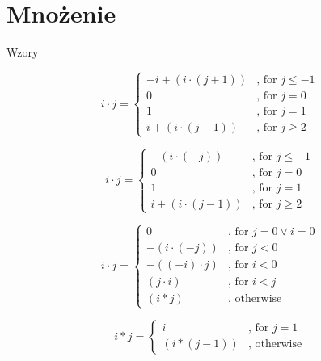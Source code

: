 \section{Mnożenie}\label{sec:mnożenie}
\begin{frame}[allowframebreaks]{Wzory}
    \begin{definition}[recursion 1]
        \[ i \cdot j =
        \begin{cases}
            -i + (i \cdot (j+1)) & \text{, for } j \leq -1 \\
            0 & \text{, for } j = 0 \\
            1 & \text{, for } j = 1 \\
            i + (i \cdot (j-1)) & \text{, for } j \geq 2
        \end{cases}
        \]
    \end{definition}
    \begin{definition}[recursion 2]
        \[ i \cdot j =
        \begin{cases}
            -(i \cdot (-j)) & \text{, for } j \leq -1 \\
            0 & \text{, for } j = 0 \\
            1 & \text{, for } j = 1 \\
            i + (i \cdot (j-1)) & \text{, for } j \geq 2
        \end{cases}
        \]
    \end{definition}
    \begin{definition}[recursion 3.1]
        \[ i \cdot j =
        \begin{cases}
            0 & \text{, for } j = 0 \lor i = 0 \\
            -(i \cdot (-j)) & \text{, for } j < 0 \\
            -((-i) \cdot j) & \text{, for } i < 0 \\
            (j \cdot i) & \text{, for } i < j \\
            (i * j) & \text{, otherwise}
        \end{cases}
        \]
    \end{definition}
    \begin{definition}[recursion 3.2]
        \[ i * j =
        \begin{cases}
            i & \text{, for } j = 1 \\
            (i * (j-1)) & \text{, otherwise}
        \end{cases}
        \]
    \end{definition}
\end{frame}
